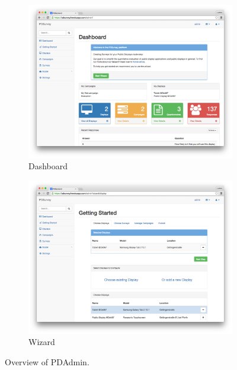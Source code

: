 		\begin{figure}
		    \centering
		    \begin{subfigure}[b]{0.7\textwidth}
		        \centering
		        \includegraphics[width=\textwidth]{img/screenshots/pdadmin/dashboard}
		        \caption{Dashboard}
				\label{fig:pdadmin-dashobard}
		    \end{subfigure}
		    \hfill
		    \begin{subfigure}[b]{0.7\textwidth}
		        \centering
		        \includegraphics[width=\textwidth]{img/screenshots/pdadmin/wizard-display_selected.png}
		        \caption{Wizard}
		        \label{fig:pdadmin-wizard}
		    \end{subfigure}
		    \caption{Overview of PDAdmin.}
		\end{figure}
		


